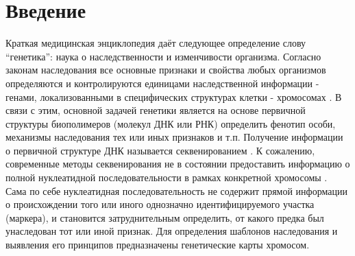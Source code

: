 \documentclass{matmex-diploma-custom}
\begin{document}
\maketitle \tableofcontents
\section*{Введение}

Краткая медицинская энциклопедия \cite{encyclope} даёт следующее
определение слову “генетика”: наука о наследственности и изменчивости
организма. Согласно законам наследования все основные признаки и
свойства любых организмов определяются и контролируются единицами
наследственной информации - генами, локализованными в специфических
структурах клетки - хромосомах \cite{intro}. В связи с этим, основной
задачей генетики является на основе первичной структуры биополимеров
(молекул ДНК или РНК) определить фенотип особи, механизмы наследования
тех или иных признаков и т.п. Получение информации о первичной
структуре ДНК называется секвенированием \cite{cito}. К сожалению,
современные методы секвенирования не в состоянии предоставить
информацию о полной нуклеатидной последовательности в рамках
конкретной хромосомы \cite{molecular}. Сама по себе нуклеатидная
последовательность не содержит прямой информации о происхождении того
или иного однозначно идентифицируемого участка (маркера), и становится
затруднительным определить, от какого предка был унаследован тот или
иной признак. Для определения шаблонов наследования и выявления его
принципов предназначены генетические карты хромосом\cite{morgan}.
\end{document}
